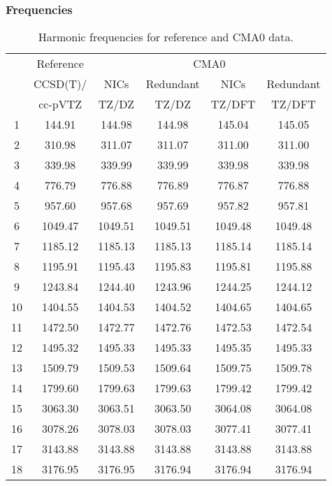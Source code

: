 \documentclass[10pt,oneside]{article}
\begin{document}
\begin{table}[h!]
\subsubsection*{Frequencies}
\centering
\caption{Harmonic frequencies for reference and CMA0 data.}
\begin{tabular}{cccccc}
\toprule
{} & Reference & \multicolumn{4}{c}{CMA0} \\
{} &  CCSD(T)/ &    NICs &  Redundant &    NICs & Redundant \\
{} &   cc-pVTZ &   TZ/DZ &      TZ/DZ &  TZ/DFT &    TZ/DFT \\
\midrule
1  &    144.91 &  144.98 &     144.98 &  145.04 &    145.05 \\
2  &    310.98 &  311.07 &     311.07 &  311.00 &    311.00 \\
3  &    339.98 &  339.99 &     339.99 &  339.98 &    339.98 \\
4  &    776.79 &  776.88 &     776.89 &  776.87 &    776.88 \\
5  &    957.60 &  957.68 &     957.69 &  957.82 &    957.81 \\
6  &   1049.47 & 1049.51 &    1049.51 & 1049.48 &   1049.48 \\
7  &   1185.12 & 1185.13 &    1185.13 & 1185.14 &   1185.14 \\
8  &   1195.91 & 1195.43 &    1195.83 & 1195.81 &   1195.88 \\
9  &   1243.84 & 1244.40 &    1243.96 & 1244.25 &   1244.12 \\
10 &   1404.55 & 1404.53 &    1404.52 & 1404.65 &   1404.65 \\
11 &   1472.50 & 1472.77 &    1472.76 & 1472.53 &   1472.54 \\
12 &   1495.32 & 1495.33 &    1495.33 & 1495.35 &   1495.33 \\
13 &   1509.79 & 1509.53 &    1509.64 & 1509.75 &   1509.78 \\
14 &   1799.60 & 1799.63 &    1799.63 & 1799.42 &   1799.42 \\
15 &   3063.30 & 3063.51 &    3063.50 & 3064.08 &   3064.08 \\
16 &   3078.26 & 3078.03 &    3078.03 & 3077.41 &   3077.41 \\
17 &   3143.88 & 3143.88 &    3143.88 & 3143.88 &   3143.88 \\
18 &   3176.95 & 3176.95 &    3176.94 & 3176.94 &   3176.94 \\
\bottomrule
\end{tabular}
\end{table}
\end{document}

